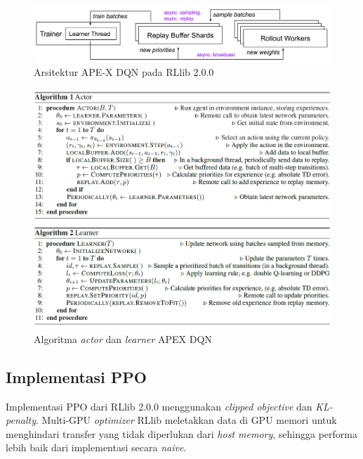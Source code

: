 \begin{figure}[H]
  \centering
    \includegraphics[scale=0.56]{gambar/rllib_apex-dqn_architecture.png}
    \caption{Arsitektur APE-X DQN pada RLlib 2.0.0 \citep{rllibDocumentation}}
    \label{fig:rllib_apex-dqn_architecture}
\end{figure}

\begin{figure}[H]
  \centering
    \includegraphics[scale=0.5]{gambar/apex_actor_learner_algorithm.png}
    \caption{Algoritma \emph{actor} dan \emph{learner} APEX DQN}
    \label{fig:apexActorLearnerAlgorithm}
\end{figure}

\subsection{Implementasi PPO}
Implementasi PPO dari RLlib 2.0.0 menggunakan \emph{clipped objective} dan \emph{KL-penalty}.
Multi-GPU \emph{optimizer} RLlib meletakkan data di GPU memori untuk menghindari transfer yang tidak diperlukan
dari \emph{host memory}, sehingga performa lebih baik dari implementasi secara \emph{naive}.

